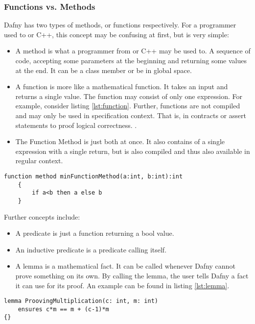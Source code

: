 \subsubsection{Functions vs. Methods}
Dafny has two types of methods, or functions respectively. For a programmer used to \Csharp or C++, this concept may be confusing at first, but is very simple:
\begin{itemize}
\item A method is what a programmer from \Csharp or C++ may be used to. A sequence of code, accepting some parameters at the beginning and returning some values at the end. It can be a class member or be in global space.
\item A function is more like a mathematical function. It takes an input and returns a single value. The function may consist of only one expression. For example, consider listing \ref{lst:function}. Further, functions are not compiled and may only be used in specification context. That is, in contracts or assert statements to proof logical correctness. \cite{functionVSMethod}.
\item The Function Method is just both at once. It also contains of a single expression with a single return, but is also compiled and thus also available in regular context. \cite{functionVSMethod}
\end{itemize}

\begin{lstlisting}[caption={Function}, captionpos=b, label={lst:function}]
    function method minFunctionMethod(a:int, b:int):int
    {
        if a<b then a else b
    }
\end{lstlisting}

Further concepts include:
\begin{itemize}
\item A predicate is just a function returning a bool value.
\item An inductive predicate is a predicate calling itself.
\item A lemma is a mathematical fact. It can be called whenever Dafny cannot prove something on its own. By calling the lemma, the user tells Dafny a fact it can use for its proof. An example can be found in listing \ref{lst:lemma}. \cite{dafnyReferenceManual}
\end{itemize}

\begin{lstlisting}[caption={Lemma}, captionpos=b, label={lst:lemma}]
lemma ProovingMultiplication(c: int, m: int)
    ensures c*m == m + (c-1)*m
{}
\end{lstlisting}

